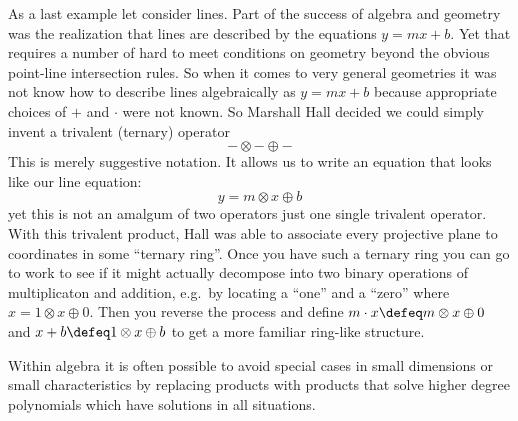 As a last example let consider lines.   Part of the success of algebra and 
geometry was the realization that lines are described by the equations $y=mx+b$.
Yet that requires a number of hard to meet conditions on geometry beyond the obvious 
point-line intersection rules.  So when it comes to very general geometries 
it was not know how to describe lines algebraically as $y=mx+b$ because 
appropriate choices of $+$ and $\cdot$ were not known.
So Marshall Hall decided we could simply invent a trivalent (ternary) operator
\[
    -\otimes-\oplus -
\]
This is merely suggestive notation.  It allows us to write an equation 
that looks like our line equation:
\[
    y=m\otimes x\oplus b
\] 
yet this is not an amalgum of two operators just one single trivalent operator.
With this trivalent product, Hall was able to associate every 
projective plane to coordinates in some ``ternary ring''.  Once you have such a ternary ring you 
can go to work to see if it might actually decompose into two binary operations of multiplicaton 
and addition, e.g.\ by locating a ``one'' and a ``zero'' where $x=1\otimes x\oplus 0$.  Then 
you reverse the process and define $m\cdot x\defeq m\otimes x\oplus 0$ and $x+b\defeq 1\otimes x\oplus b$
to get a more familiar ring-like structure.


Within algebra it is often possible to avoid special cases in small dimensions 
or small characteristics by replacing products with products that solve higher 
degree polynomials which have solutions in all situations.  